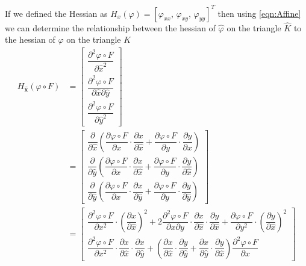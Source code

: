 If we defined the Hessian as $H_x(\varphi) = \left[ \varphi_{xx},\,
\varphi_{xy},\, \varphi_{yy}\right]^T$ then using \eqref{eqn:Affine} we can
determine the relationship between the hessian of $\hat{\varphi}$ on the
triangle $\hat{K}$ to the hessian of $\varphi$ on the triangle $K$
\begin{align*}
  H_{\mathbf{\hat{x}}}(\varphi\circ F) &= \begin{bmatrix} 
    \dfrac{\partial^2 \varphi\circ F}{\partial \hat{x}^2} \\[1em]
    \dfrac{\partial^2 \varphi\circ F}{\partial \hat{x} \partial\hat{y}} \\[1em]
    \dfrac{\partial^2 \varphi\circ F}{\partial \hat{y}^2} 
  \end{bmatrix} \\
  &= \begin{bmatrix} 
    \dfrac{\partial}{\partial \hat{x}}\left( \dfrac{\partial \varphi\circ
      F}{\partial x}\cdot \dfrac{\partial x}{\partial \hat{x}} + \dfrac{\partial
      \varphi\circ F}{\partial y}\cdot \dfrac{\partial y}{\partial
      \hat{x}} \right) \\[1em] 
    \dfrac{\partial}{\partial \hat{y}}\left( \dfrac{\partial \varphi\circ
      F}{\partial x}\cdot \dfrac{\partial x}{\partial \hat{x}} + \dfrac{\partial
      \varphi\circ F}{\partial y}\cdot \dfrac{\partial y}{\partial
      \hat{x}} \right) \\[1em] 
    \dfrac{\partial}{\partial \hat{y}}\left( \dfrac{\partial \varphi\circ
      F}{\partial x}\cdot \dfrac{\partial x}{\partial \hat{y}} + \dfrac{\partial
      \varphi\circ F}{\partial y}\cdot \dfrac{\partial y}{\partial
      \hat{y}} \right) 
  \end{bmatrix} \\ 
  &= \begin{bmatrix}
    \dfrac{\partial^2 \varphi\circ F}{\partial x^2}\cdot \left(\dfrac{\partial
      x}{\partial \hat{x}}\right)^2 + 2 \dfrac{\partial^2 \varphi\circ F}{\partial x
      \partial y} \cdot \dfrac{\partial x}{\partial \hat{x}} \cdot
      \dfrac{\partial y}{\partial \hat{x}} + \dfrac{\partial \varphi\circ
      F}{\partial y^2}\cdot \left(\dfrac{\partial y}{\partial \hat{x}}\right)^2 \\[1em]
    \dfrac{\partial^2 \varphi\circ F}{\partial x^2}\cdot \dfrac{\partial
      x}{\partial \hat{x}}\cdot \dfrac{\partial x}{\partial \hat{y}} + \left(
      \dfrac{\partial x}{\partial \hat{x}}\cdot \dfrac{\partial y}{\partial
      \hat{y}} + \dfrac{\partial x}{\partial \hat{y}}\cdot
      \dfrac{\partial y}{\partial \hat{x}} \right) \dfrac{\partial^2 \varphi\circ F}{\partial x
}
\end{bmatrix}
\end{align*}
